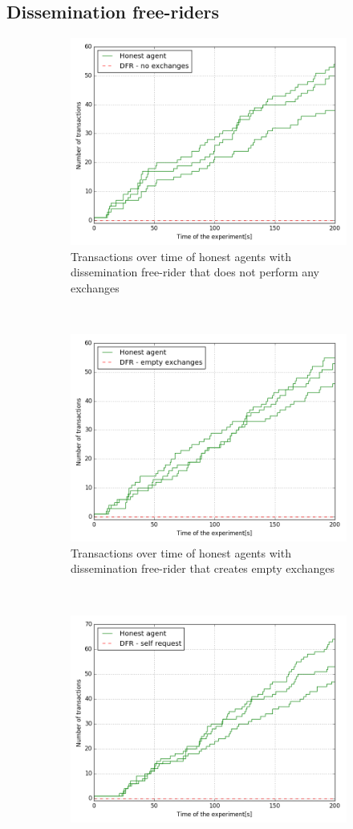 \subsection{Dissemination free-riders}

\begin{figure}
    \centering
    \begin{subfigure}{\textwidth}
      \centering
      \includegraphics[width=.6\linewidth]{images/DFR_no_exchanges}
      \caption{Transactions over time of honest agents with dissemination free-rider that does not 
      perform any exchanges}
      \label{fig:DFR_no_exchanges}
    \end{subfigure}\\
    \begin{subfigure}{\textwidth}
      \centering
      \includegraphics[width=.6\linewidth]{images/DFR_empty_exchanges}
      \caption{Transactions over time of honest agents with dissemination free-rider that creates 
      empty exchanges}
      \label{fig:DFR_empty_exchanges}
    \end{subfigure}\\
    \begin{subfigure}{\textwidth}
        \centering
        \includegraphics[width=.6\linewidth]{images/DFR_self_request}

\end{subfigure}
\end{figure}
